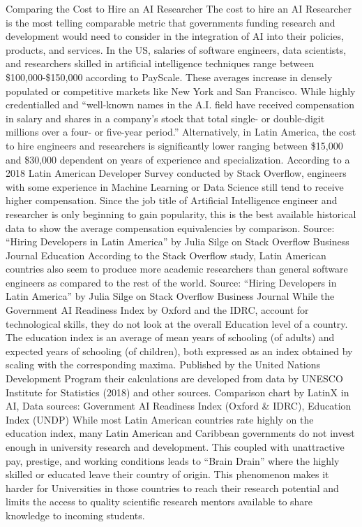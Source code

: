 \documentclass[conference]{IEEEtran}
\begin{document}
Comparing the Cost to Hire an AI Researcher
The cost to hire an AI Researcher is the most telling comparable metric that governments funding research and development would need to consider in the integration of AI into their policies, products, and services. In the US, salaries of software engineers, data scientists, and researchers skilled in artificial intelligence techniques range between \$100,000-\$150,000 according to PayScale. These averages increase in densely populated or competitive markets like New York and San Francisco. While highly credentialled and ``well-known names in the A.I. field have received compensation in salary and shares in a company's stock that total single- or double-digit millions over a four- or five-year period.''
Alternatively, in Latin America, the cost to hire engineers and researchers is significantly lower ranging between \$15,000 and \$30,000 dependent on years of experience and specialization. According to a 2018 Latin American Developer Survey conducted by Stack Overflow, engineers with some experience in Machine Learning or Data Science still tend to receive higher compensation. Since the job title of Artificial Intelligence engineer and researcher is only beginning to gain popularity, this is the best available historical data to show the average compensation equivalencies by comparison.
Source: ``Hiring Developers in Latin America'' by Julia Silge on Stack Overflow Business Journal
Education
According to the Stack Overflow study, Latin American countries also seem to produce more academic researchers than general software engineers as compared to the rest of the world.
Source: ``Hiring Developers in Latin America'' by Julia Silge on Stack Overflow Business Journal
While the Government AI Readiness Index by Oxford and the IDRC, account for technological skills, they do not look at the overall Education level of a country. The education index is an average of mean years of schooling (of adults) and expected years of schooling (of children), both expressed as an index obtained by scaling with the corresponding maxima. Published by the United Nations Development Program their calculations are developed from data by UNESCO Institute for Statistics (2018) and other sources.
Comparison chart by LatinX in AI\texttrademark, Data sources: Government AI Readiness Index (Oxford \& IDRC), Education Index (UNDP)
While most Latin American countries rate highly on the education index, many Latin American and Caribbean governments do not invest enough in university research and development. This coupled with unattractive pay, prestige, and working conditions leads to ``Brain Drain'' where the highly skilled or educated leave their country of origin. This phenomenon makes it harder for Universities in those countries to reach their research potential and limits the access to quality scientific research mentors available to share knowledge to incoming students.
\end{document}

